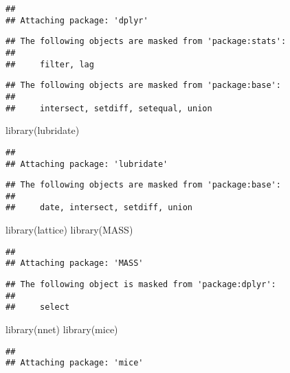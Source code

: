 \documentclass[
]{article}
\newenvironment{Shaded}{\begin{snugshade}}{\end{snugshade}}
\newcommand{\FunctionTok}[1]{\textcolor[rgb]{0.00,0.00,0.00}{#1}}
\newcommand{\NormalTok}[1]{#1}
\begin{document}
\begin{verbatim}
## 
## Attaching package: 'dplyr'
\end{verbatim}

\begin{verbatim}
## The following objects are masked from 'package:stats':
## 
##     filter, lag
\end{verbatim}

\begin{verbatim}
## The following objects are masked from 'package:base':
## 
##     intersect, setdiff, setequal, union
\end{verbatim}

\begin{Shaded}
\begin{Highlighting}[]
\FunctionTok{library}\NormalTok{(lubridate)}
\end{Highlighting}
\end{Shaded}

\begin{verbatim}
## 
## Attaching package: 'lubridate'
\end{verbatim}

\begin{verbatim}
## The following objects are masked from 'package:base':
## 
##     date, intersect, setdiff, union
\end{verbatim}

\begin{Shaded}
\begin{Highlighting}[]
\FunctionTok{library}\NormalTok{(lattice) }
\FunctionTok{library}\NormalTok{(MASS)}
\end{Highlighting}
\end{Shaded}

\begin{verbatim}
## 
## Attaching package: 'MASS'
\end{verbatim}

\begin{verbatim}
## The following object is masked from 'package:dplyr':
## 
##     select
\end{verbatim}

\begin{Shaded}
\begin{Highlighting}[]
\FunctionTok{library}\NormalTok{(nnet)}
\FunctionTok{library}\NormalTok{(mice)}
\end{Highlighting}
\end{Shaded}

\begin{verbatim}
## 
## Attaching package: 'mice'
\end{verbatim}
\end{document}
